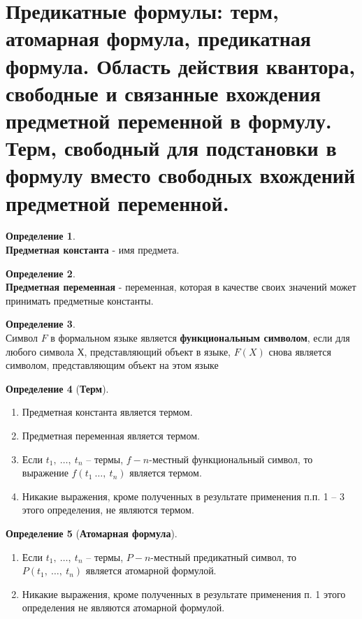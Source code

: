 \documentclass[a4paper,12pt]{article}
\theoremstyle{definition} %
\newtheorem{definition}{Определение}[section]
\theoremstyle{definition} %
\theoremstyle{remark} %
\newcommand{\krs}[1]{\left(#1\right)}
\begin{document}
\newpage

\section{Предикатные формулы: терм, атомарная формула, предикатная формула. Область действия квантора, свободные и связанные вхождения предметной переменной в формулу. Терм, свободный для подстановки в формулу вместо свободных вхождений предметной переменной.}

	\begin{definition} \ \\[1ex]
		\textbf{Предметная константа} - имя предмета.
	\end{definition}

	\begin{definition} \ \\[1ex]
		\textbf{Предметная переменная} - переменная, которая в качестве своих значений может принимать предметные константы.
	\end{definition}

	\begin{definition} \ \\[1ex]
		Символ $F$ в формальном языке является \textbf{функциональным символом}, если для любого символа $Х$, представляющий объект в языке, $F \krs{X}$ снова является символом, представляющим объект на этом языке
	\end{definition}

	\begin{definition}[\textbf{Терм}] \ \\
		\begin{enumerate}
			\item Предметная константа является термом.
			\item Предметная переменная является термом.
			\item Если $t_{1} , \ \dots , \ t_{n}$ -- термы, $f - n$-местный функциональный символ, то выражение $f \krs{t_{1} \ \dots , \ t_{n}}$ является термом.
			\item Никакие выражения, кроме полученных в результате применения п.п. 1 -- 3 этого определения, не являются термом.
		\end{enumerate}
	\end{definition}

	\begin{definition}[\textbf{Атомарная формула}] \
		\begin{enumerate}
			\item Если $t_{1} , \ \dots , \ t_{n}$ -- термы, $P - n$-местный предикатный символ, то $P \krs{t_{1}, \ \dots , \ t_{n}}$ является атомарной формулой.
			\item Никакие выражения, кроме полученных в результате применения п. 1 этого определения не являются атомарной формулой.
		\end{enumerate}
	\end{definition}
\end{document}
